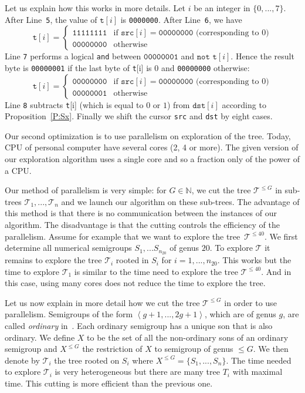 \documentclass[reqno,11pt]{amsart}
\theoremstyle{plain}
\theoremstyle{definition}
\renewcommand{\leq}{\leqslant}
\newcommand{\NN}{\mathbb{N}}
\renewcommand{\tt}[1]{\texttt{#1}}
\begin{document}
Let us explain how this works in more details. 
Let $i$ be an integer in $\{0,...,7\}$.  
After Line~\tt{5}, the value of $\tt{t}[i]$ is \tt{0000000}. 
After Line~\tt{6}, we have 
\[
\tt{t}[i]=\begin{cases}
\tt{11111111}&\text{if $\tt{src}[i]=\tt{00000000}$ (corresponding to $0$)}\\
\tt{00000000}&\text{otherwise}
\end{cases}
\]
Line \tt{7} performs a logical \tt{and} between $\tt{00000001}$ and $\tt{not t}[i]$. Hence the result byte is \tt{00000001} if the last byte of \tt{t}[i] is $0$ and \tt{00000000} otherwise: 
\[
\tt{t}[i]=\begin{cases}
\tt{00000000}&\text{if $\tt{src}[i]=\tt{00000000}$ (corresponding to $0$)}\\
\tt{00000001}&\text{otherwise}
\end{cases}
\]
 Line \tt{8} subtracts \tt{t}[i] (which is equal to $0$ or $1$) from $\tt{dst}[i]$ according to Proposition~\ref{P:Sx}. 
Finally we shift the cursor \tt{src} and \tt{dst} by eight cases. 

Our second optimization  is to use parallelism on exploration of the tree.
Today, CPU of personal computer have several cores (2, 4 or more). 
The given version of our exploration algorithm  uses a single core and so a fraction only of the power of a CPU.

Our method of parallelism is very simple: for $G\in \NN$,  we cut the tree $\mathcal{T}^{\leq G}$ in sub-trees $\mathcal{T}_1,...,\mathcal{T}_n$ and we launch our algorithm on these sub-trees. 
The advantage of this method is that there is no communication between the instances of our algorithm. 
The disadvantage is that the cutting controls the efficiency of the parallelism. 
Assume for example that we want to explore the tree~$\mathcal{T}^{\leq 40}$.
We first determine all numerical semigroups $S_1,...S_{n_{20}}$ of genus $20$. 
To explore $\mathcal{T}$ it remains to explore the tree $\mathcal{T}_i$ rooted in $S_i$ for $i=1,...,n_{20}$. 
This works but the time to explore $\mathcal{T}_1$ is similar to the time need to explore the tree $\mathcal{T}^{\leq 40}$. 
And in this case, using many cores does not reduce the time to explore the tree.

Let us now explain in more detail how we cut the tree $\mathcal{T}^{\leq G}$ in order to use parallelism.
Semigroups of the form $\left<g+1,...,2g+1\right>$, which are of genus $g$, are called \emph{ordinary} in~\cite{Elizalde}. 
Each ordinary semigroup has a unique son that is also ordinary. 
We define $X$ to be the set of all the non-ordinary sons of an ordinary semigroup and $X^{\leq G}$ the restriction of $X$ to semigroup of genus $\leq G$. 
We then denote by  $\mathcal{T}_i$ the tree rooted on $S_i$ where $X^{\leq G}=\{S_1,...,S_n\}$. 
The time needed to explore $\mathcal{T}_i$ is very heterogeneous but there are many tree $T_i$ with maximal time. 
This cutting is more efficient than the previous one.
\end{document}
